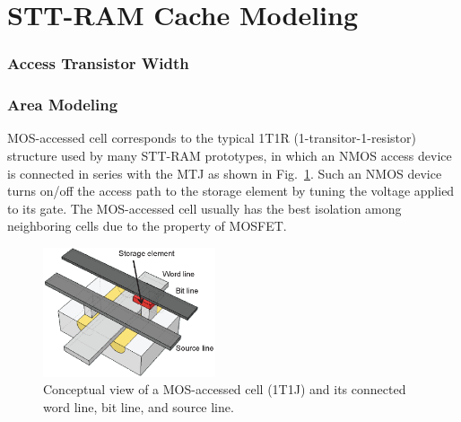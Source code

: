 \section{STT-RAM Cache Modeling} \label{sec:model}

\subsubsection{Access Transistor Width}

\subsubsection{Area Modeling}

MOS-accessed cell corresponds to the typical 1T1R (1-transitor-1-resistor) structure used by many STT-RAM prototypes, in which an NMOS access device is connected in series with the MTJ as shown in Fig.~\ref{fig:1t1r}.  Such an NMOS device turns on/off the access path to the storage element by tuning the voltage applied to its gate.  The MOS-accessed cell usually has the best isolation among neighboring cells due to the property of MOSFET.

\begin{figure}[t]
  \centering
  \includegraphics[width=2.0in]{fig/1t1r.eps}
  \caption{Conceptual view of a MOS-accessed cell (1T1J) and its connected word line, bit line, and source line.}
  \label{fig:1t1r}
\end{figure}

